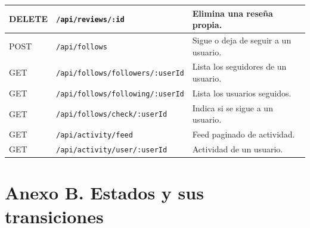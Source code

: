 \documentclass[doc,12pt,a4paper]{apa7}
\begin{document}
\begin{longtable}{|P{1.8cm}|P{6.4cm}|L{6.4cm}|}
DELETE & \texttt{/api/reviews/:id} & Elimina una reseña propia. \\ \hline
POST & \texttt{/api/follows} & Sigue o deja de seguir a un usuario. \\ \hline
GET & \texttt{/api/follows/followers/:userId} & Lista los seguidores de un usuario. \\ \hline
GET & \texttt{/api/follows/following/:userId} & Lista los usuarios seguidos. \\ \hline
GET & \texttt{/api/follows/check/:userId} & Indica si se sigue a un usuario. \\ \hline
GET & \texttt{/api/activity/feed} & Feed paginado de actividad. \\ \hline
GET & \texttt{/api/activity/user/:userId} & Actividad de un usuario. \\ \hline
\end{longtable}

\normalsize

\section*{Anexo B. Estados y sus transiciones}
\end{document}
